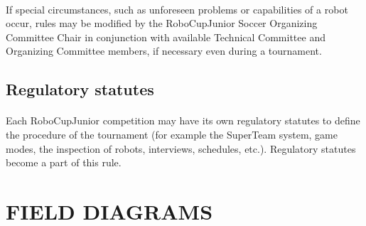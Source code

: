 \documentclass{article}
\newcommand*{\p}{\paragraph{}}
\begin{document}
\p If special circumstances, such as unforeseen problems or capabilities of a
robot occur, rules may be modified by the RoboCupJunior Soccer Organizing
Committee Chair in conjunction with available Technical Committee and
Organizing Committee members, if necessary even during a tournament.

\subsection{Regulatory statutes \label{ref-051}}

\p Each RoboCupJunior competition may have its own regulatory statutes to define
the procedure of the tournament (for example the SuperTeam system, game modes,
the inspection of robots, interviews, schedules, etc.). Regulatory statutes
become a part of this rule.

\section*{FIELD DIAGRAMS}
\end{document}
